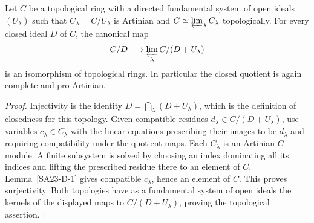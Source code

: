 \begin{lemma}\label{SA23-D-2}
Let $C$ be a topological ring with a directed fundamental system of
open ideals $(U_\lambda)$ such that $C_\lambda=C/U_\lambda$ is
Artinian and $C\simeq\varprojlim_\lambda C_\lambda$ topologically.
For every closed ideal $D$ of $C$, the canonical map
\[
 C/D\longrightarrow\varprojlim_\lambda C/(D+U_\lambda)
\]
is an isomorphism of topological rings.  In particular the closed
quotient is again complete and pro-Artinian.
\end{lemma}
\begin{proof}
Injectivity is the identity
$D=\bigcap_\lambda(D+U_\lambda)$, which is the definition of
closedness for this topology.  Given compatible residues
$d_\lambda\in C/(D+U_\lambda)$, use variables
$c_\lambda\in C_\lambda$ with the linear equations prescribing
their images to be $d_\lambda$ and requiring compatibility under the
quotient maps.  Each $C_\lambda$ is an Artinian $C$-module.  A finite
subsystem is solved by choosing an index dominating all its indices
and lifting the prescribed residue there to an element of $C$.
Lemma~\ref{SA23-D-1} gives compatible $c_\lambda$, hence an element
of $C$.  This proves surjectivity.  Both topologies have as a
fundamental system of open ideals the kernels of the displayed maps
to $C/(D+U_\lambda)$, proving the topological assertion.
\end{proof}

